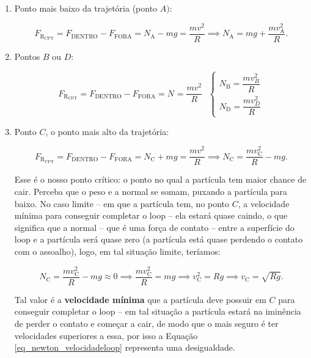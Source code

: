 \begin{enumerate}
    \item [(i)] Ponto mais baixo da trajetória (ponto $A)$:

    $$ F_{\text{R}_\text{CPT}} = F_{\text{DENTRO}} - F_{\text{FORA}} = N_{\text{A}} - mg =\dfrac{mv^2}{R} \implies \boxed{N_{\text{A}} = mg + \dfrac{mv^2_{\text{A}}}{R}.} $$

    \item [(ii)] Pontos $B$ ou $D:$

    $$ F_{\text{R}_\text{CPT}} = F_{\text{DENTRO}} - F_{\text{FORA}} = N_{\text{}} = \dfrac{mv^2}{R} \text{ } \begin{cases}
N_{\text{B}} = \dfrac{mv_B^2}{R} \\[8pt]
N_{\text{D}} = \dfrac{mv_D^2}{R}
\end{cases} $$

\item [(iii)] Ponto $C$, o ponto mais alto da trajetória:

 $$ F_{\text{R}_\text{CPT}} = F_{\text{DENTRO}} - F_{\text{FORA}} = N_{\text{C}} + mg =\dfrac{mv^2}{R} \implies \boxed{N_{\text{C}} =  \dfrac{mv^2_{\text{C}}}{R} - mg .} $$

 Esse é o nosso ponto crítico: o ponto no qual a partícula tem maior chance de cair. Perceba que o peso e a normal se somam, puxando a partícula para baixo. No caso limite -- em que a partícula tem, no ponto $C$, a velocidade mínima para conseguir completar o loop -- ela estará quase caindo, o que significa que a normal -- que é uma força de contato -- entre a superfície do loop e a partícula será quase zero (a partícula está quase perdendo o contato com o assoalho), logo, em tal situação limite, teríamos:

 $$  N_{\text{C}} = \dfrac{mv^2_{\text{C}}}{R} - mg \approx 0 \implies \dfrac{mv^2_{\text{C}}}{R} = mg \implies  v^2_{\text{C}} = Rg \implies \boxed{v_{\text{C}} = \sqrt{Rg}.}$$

 Tal valor é a \textbf{velocidade mínima} que a partícula deve possuir em $C$ para conseguir completar o loop -- em tal situação a partícula estará na iminência de perder o contato e começar a cair, de modo que o mais seguro é ter velocidades superiores a essa, por isso a Equação \eqref{eq_newton_velocidadeloop} representa uma desigualdade.
    
\end{enumerate}




